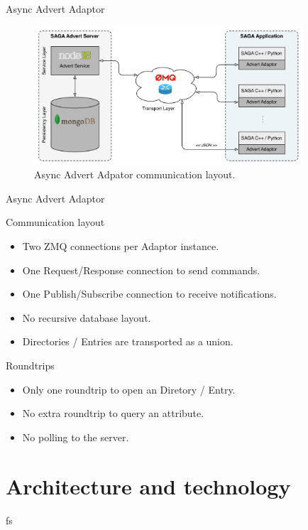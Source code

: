 \documentclass{beamer}
\begin{document}
    \begin{frame}{Async Advert Adaptor}
      \begin{figure}
        \includegraphics[width=10cm]{new_technology_overview}
        \caption{Async Advert Adpator communication layout.}  
      \end{figure}
    \end{frame}
    
    \begin{frame}{Async Advert Adaptor}
      \begin{block}{Communication layout}
        \begin{itemize}
          \item Two ZMQ connections per Adaptor instance.
          \item One Request/Response connection to send commands.
          \item One Publish/Subscribe connection to receive notifications.
          \item No recursive database layout.
          \item Directories / Entries are transported as a union.
        \end{itemize}
      \end{block}
      
      \begin{alertblock}{Roundtrips}
             \begin{itemize}
               \item Only one roundtrip to open an Diretory / Entry.
               \item No extra roundtrip to query an attribute.
               \item No polling to the server.
             \end{itemize} 
      \end{alertblock}
    \end{frame}
  
  \section{Architecture and technology}
    \begin{frame}
      fs
    \end{frame}
    
\end{document}
